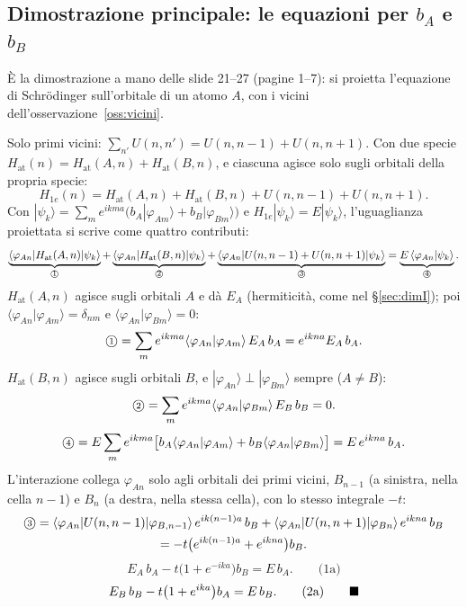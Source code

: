 \documentclass[11pt,a4paper]{article}
\begin{document}
\subsection{Dimostrazione principale: le equazioni per $b_A$ e $b_B$}
È la dimostrazione a mano delle slide 21--27 (pagine 1--7): si proietta l'equazione di Schrödinger sull'orbitale di un atomo $A$, con i vicini
dell'osservazione~\ref{oss:vicini}.
\begin{dimostrazione}
Solo primi vicini: $\sum_{n'}U(n,n')=U(n,n-1)+U(n,n+1)$. Con due specie $H_{\mathrm{at}}(n)=H_{\mathrm{at}}(A,n)+H_{\mathrm{at}}(B,n)$, e ciascuna agisce
solo sugli orbitali della propria specie:
\[
H_{1e}(n)=H_{\mathrm{at}}(A,n)+H_{\mathrm{at}}(B,n)+U(n,n-1)+U(n,n+1).
\]
Con $|\psi_k\rangle=\sum_me^{ikma}\bigl(b_A|\varphi_{Am}\rangle+b_B|\varphi_{Bm}\rangle\bigr)$ e $H_{1e}|\psi_k\rangle=E|\psi_k\rangle$, l'uguaglianza
proiettata si scrive come quattro contributi:
\[
\underbrace{\langle\varphi_{An}|H_{\mathrm{at}}(A,n)|\psi_k\rangle}_{\text{\textcircled{\scriptsize 1}}}+\underbrace{\langle\varphi_{An}|H_{\mathrm{at}}(B,n)|\psi_k\rangle}_{\text{\textcircled{\scriptsize 2}}}
+\underbrace{\langle\varphi_{An}|U(n,n-1)+U(n,n+1)|\psi_k\rangle}_{\text{\textcircled{\scriptsize 3}}}=\underbrace{E\,\langle\varphi_{An}|\psi_k\rangle}_{\text{\textcircled{\scriptsize 4}}}.
\]
$H_{\mathrm{at}}(A,n)$ agisce sugli orbitali $A$ e dà $E_A$ (hermiticità, come nel §\ref{sec:dimI}); poi $\langle\varphi_{An}|\varphi_{Am}\rangle=\delta_{nm}$
e $\langle\varphi_{An}|\varphi_{Bm}\rangle=0$:
\[
\text{\textcircled{\scriptsize 1}}=\sum_me^{ikma}\langle\varphi_{An}|\varphi_{Am}\rangle\,E_A\,b_A=e^{ikna}E_A\,b_A .
\]
$H_{\mathrm{at}}(B,n)$ agisce sugli orbitali $B$, e $|\varphi_{An}\rangle\perp|\varphi_{Bm}\rangle$ sempre ($A\ne B$):
\[
\text{\textcircled{\scriptsize 2}}=\sum_me^{ikma}\langle\varphi_{An}|\varphi_{Bm}\rangle\,E_B\,b_B=0 .
\]
\[
\text{\textcircled{\scriptsize 4}}=E\sum_me^{ikma}\bigl[b_A\langle\varphi_{An}|\varphi_{Am}\rangle+b_B\langle\varphi_{An}|\varphi_{Bm}\rangle\bigr]=E\,e^{ikna}\,b_A .
\]
L'interazione collega $\varphi_{An}$ solo agli orbitali dei primi vicini, $B_{n-1}$ (a sinistra, nella cella $n-1$) e $B_n$ (a destra, nella stessa
cella), con lo stesso integrale $-t$:
\begin{multline*}
\text{\textcircled{\scriptsize 3}}=\langle\varphi_{An}|U(n,n-1)|\varphi_{B,n-1}\rangle\,e^{ik(n-1)a}\,b_B+\langle\varphi_{An}|U(n,n+1)|\varphi_{Bn}\rangle\,e^{ikna}\,b_B\\
=-t\bigl(e^{ik(n-1)a}+e^{ikna}\bigr)b_B .
\end{multline*}
\[
E_A\,b_A-t\bigl(1+e^{-ika}\bigr)b_B=E\,b_A .\qquad\text{(1a)}
\]
\[
E_B\,b_B-t\bigl(1+e^{ika}\bigr)b_A=E\,b_B .\qquad\text{(2a)}\qed
\]
\end{dimostrazione}
\end{document}
